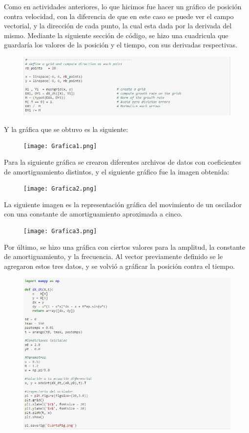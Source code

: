 \documentclass{article}
\begin{document}
Como en actividades anteriores, lo que hicimos fue hacer un gráfico de posición contra velocidad, con la diferencia de que en este caso se puede ver el campo vectorial, y la dirección de cada punto, la cual esta dada por la derivada del mismo. Mediante la siguiente sección de código, se hizo una cuadricula que guardaría los valores de la posición y el tiempo, con sus derivadas respectivas.
\begin{figure}[H]
    \includegraphics[width=1\textwidth]{Celda2.PNG}
    \centering
    \label{Cod}
\end{figure}
Y la gráfica que se obtuvo es la siguiente:
\begin{figure}[H]
    \texttt{[image: Grafica1.png]}
    \centering
    \label{Cod}
\end{figure}
Para la siguiente gráfica se crearon diferentes archivos de datos con coeficientes de amortiguamiento distintos, y el siguiente gráfico fue la imagen obtenida:
\begin{figure}[H]
    \texttt{[image: Grafica2.png]}
    \centering
    \label{Cod}
\end{figure}
La siguiente imagen es la representación gráfica del movimiento de un oscilador con una constante de amortiguamiento aproximada a cinco.
\begin{figure}[H]
    \texttt{[image: Grafica3.png]}
    \centering
    \label{Cod}
\end{figure}
Por último, se hizo una gráfica con ciertos valores para la amplitud, la constante de amortiguamiento, y la frecuencia. Al vector previamente definido se le agregaron estos tres datos, y se volvió a gráficar la posición contra el tiempo.
\begin{figure}[H]
    \includegraphics[width=1\textwidth]{Celda3.PNG}
    \centering
    \label{Cod}
\end{figure}
\end{document}
